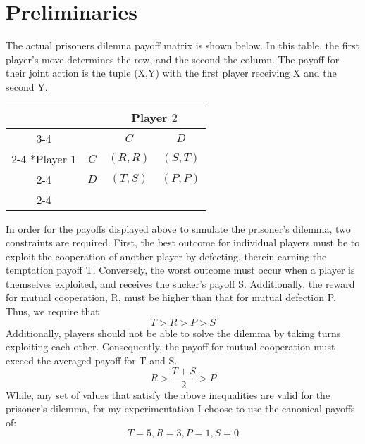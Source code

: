 \documentclass[12pt]{amsart}
\newcommand{\0}{\mat{0}}
\newcommand{\1}{\mathds{1}}
\begin{document}
\section{Preliminaries} 
\label{sec:preliminaries}
The actual prisoners dilemna payoff matrix is shown below.  In this table, the first player's move determines the row, and the second the column.  The payoff for their joint action is the tuple (X,Y) with the first player receiving X and the second Y. 
\begin{center}
 \begin{table}[ht]
    \setlength{\extrarowheight}{2pt}
    \begin{tabular}{*{4}{c|}}
      \multicolumn{2}{c}{} & \multicolumn{2}{c}{Player $2$}\\\cline{3-4}
      \multicolumn{1}{c}{} &  & $C$  & $D$ \\\cline{2-4}
      \multirow{2}*{Player $1$}  & $C$ & $(R,R)$ & $(S,T)$ \\\cline{2-4}
      & $D$ & $(T,S)$ & $(P,P)$ \\\cline{2-4}
    \end{tabular}
  \end{table}\end{center}
  
  In order for the payoffs displayed above to simulate the prisoner's dilemma, two constraints are required.  First, the best outcome for individual players must be to exploit the cooperation of another player by defecting, therein earning the temptation payoff T.  Conversely, the worst outcome must occur when a player is themselves exploited, and receives the sucker's payoff S.  Additionally, the reward for mutual cooperation, R, must be higher than that for mutual defection P.  Thus, we require that
  $$
  T > R > P > S
  $$ Additionally, players should not be able to solve the dilemma by taking turns exploiting each other.  Consequently, the payoff for mutual cooperation must exceed the averaged payoff for T and S.  
  $$
  R > \frac{T + S}{2} > P
  $$
  While, any set of values that satisfy the above inequalities are valid for the prisoner's dilemma, for my experimentation I choose to use the canonical payoffs of: 
  $${T=5, R=3, P=1, S=0}$$  \vspace{1 cm}
  
\end{document}
